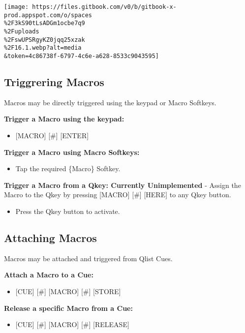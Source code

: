 \documentclass[
]{article}
\providecommand{\tightlist}{%
  \setlength{\itemsep}{0pt}\setlength{\parskip}{0pt}}
\begin{document}
\texttt{[image: https://files.gitbook.com/v0/b/gitbook-x-prod.appspot.com/o/spaces\\\%2F3kS90tLsADGm1ocbe7q9\\\%2Fuploads\\\%2FswUPSRgyKZ0jqq25xzak\\\%2F16.1.webp?alt=media\\\&token=4c86738f-6797-4c6e-a628-8533c9043595]}

\hypertarget{triggrering-macros}{%
\subsection{Triggrering Macros}\label{triggrering-macros}}

Macros may be directly triggered using the keypad or Macro Softkeys.

\textbf{Trigger a Macro using the keypad:}

\begin{itemize}
\tightlist
\item
  {[}MACRO{]} {[}\#{]} {[}ENTER{]}
\end{itemize}

\textbf{Trigger a Macro using Macro Softkeys:}

\begin{itemize}
\tightlist
\item
  Tap the required \{Macro\} Softkey.
\end{itemize}

{\textbf{Trigger a Macro from a Qkey: Currently Unimplemented}}
- Assign the Macro to the Qkey by pressing {[}MACRO{]} {[}\#{]} {[}HERE{]} to any Qkey button.

\begin{itemize}
\tightlist
\item
  {Press the Qkey button to activate. }
\end{itemize}

\hypertarget{attaching-macros}{%
\subsection{Attaching Macros}\label{attaching-macros}}

Macros may be attached and triggered from Qlist Cues.

\textbf{Attach a Macro to a Cue:}

\begin{itemize}
\tightlist
\item
  {[}CUE{]} {[}\#{]} {[}MACRO{]} {[}\#{]} {[}STORE{]}
\end{itemize}

\textbf{Release a specific Macro from a Cue:}

\begin{itemize}
\tightlist
\item
  {[}CUE{]} {[}\#{]} {[}MACRO{]} {[}\#{]} {[}RELEASE{]}
\end{itemize}
\end{document}
